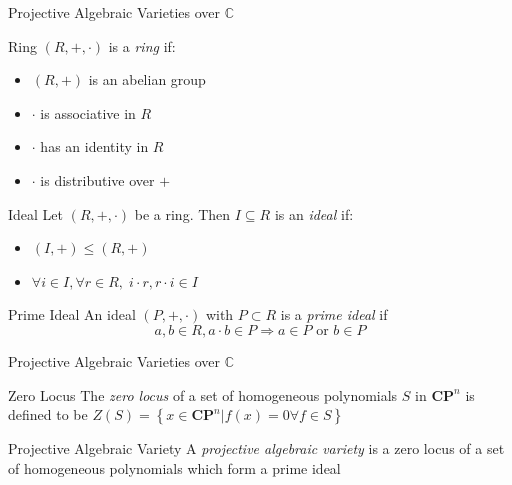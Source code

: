 \documentclass{beamer}
\newcommand{\Complex}{\mathbb{C}}
\newcommand{\CP}{\mathbf{CP}}
\begin{document}
  \begin{frame}{Projective Algebraic Varieties over $\Complex$}
      \linespread{0.7}
      \pause
      \begin{block}{Ring}
          $(R, +, \cdot)$ is a \textit{ring} if:
      \begin{multicols}{2}
          \begin{itemize}
              \item $(R, +)$ is an abelian group
              \item $\cdot$ is associative in $R$
              \item $\cdot$ has an identity in $R$
              \item $\cdot$ is distributive over $+$
          \end{itemize}
      \end{multicols}
      \end{block}
      \pause
      \begin{block}{Ideal}
          Let $(R, +, \cdot)$ be a ring. Then $I \subseteq R$ is an \textit{ideal} if:
          \begin{multicols}{2}
              \begin{itemize}
                  \item $(I, +) \le (R, +)$
                  \item $\forall i \in I, \forall r \in R, \; i \cdot r, r
                      \cdot i \in I$
              \end{itemize}
          \end{multicols}
      \end{block}
      \pause
      \begin{block}{Prime Ideal}
          An ideal $(P, +, \cdot)$ with $P \subset R$ is a \textit{prime
          ideal} if
          $$a, b \in R, a\cdot b \in P \Rightarrow a \in P \textrm{ or
          } b \in P$$
      \end{block}
  \end{frame}
  \begin{frame}{Projective Algebraic Varieties over $\Complex$}
      \pause
      \begin{block}{Zero Locus}
          The \textit{zero locus} of a set of homogeneous polynomials $S$ in
          $\CP^n$ is defined to be $Z(S) = \left\{ x \in \CP^n | f(x) = 0
          \forall f \in S \right\}$
      \end{block}
      \pause
      \begin{block}{Projective Algebraic Variety}
          A \textit{projective algebraic variety} is a zero locus of a set of
          homogeneous polynomials which form a prime ideal
      \end{block}
  \end{frame}
\end{document}
